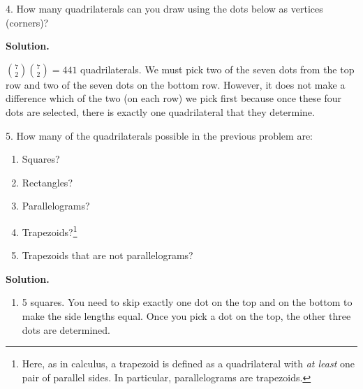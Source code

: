 \documentclass[10pt,]{book}
\theoremstyle{plain}
\theoremstyle{definition}
\theoremstyle{definition}
\theoremstyle{definition}
\numberwithin{equation}{section}
\begin{document}
\begin{exerciselist}
\begin{enumerate}[label=(\alph*)]
\end{enumerate}
\item[4.]\hypertarget{exercise-63}{}
                How many quadrilaterals can you draw using the dots below as vertices (corners)?
\leavevmode%
\begin{figure}
\centering
{
}
\end{figure}
\par\smallskip
\par\smallskip
\noindent\textbf{Solution.}\hypertarget{solution-94}{}\quad

                \({7\choose 2}{7\choose 2} = 441\) quadrilaterals. We must pick two of the seven dots from the top row and two of the seven dots on the bottom row. However, it does not make a difference which of the two (on each row) we pick first because once these four dots are selected, there is exactly one quadrilateral that they determine.
\item[5.]\hypertarget{exercise-64}{}
                How many of the quadrilaterals possible in the previous problem are:
\leavevmode%
\begin{enumerate}[label=(\alph*)]
\item\hypertarget{li-480}{} Squares? %
\item\hypertarget{li-481}{} Rectangles? %
\item\hypertarget{li-482}{} Parallelograms? %
\item\hypertarget{li-483}{} Trapezoids?\footnote{Here, as in calculus, a trapezoid is defined as a quadrilateral with \emph{at least} one pair of parallel sides.  In particular, parallelograms are trapezoids.\label{fn-2}} %
\item\hypertarget{li-484}{} Trapezoids that are not parallelograms? %
\end{enumerate}
\par\smallskip
\par\smallskip
\noindent\textbf{Solution.}\hypertarget{solution-95}{}\quad
\leavevmode%
\begin{enumerate}[label=(\alph*)]
\item\hypertarget{li-485}{} 5 squares. You need to skip exactly one dot on the top and on the bottom to make the side lengths equal.  Once you pick a dot on the top, the other three dots are determined. %

\end{enumerate}
\end{exerciselist}
\end{document}
